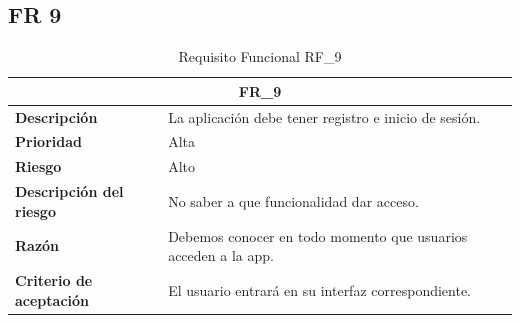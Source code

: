 \documentclass{scrreprt}
\begin{document}
\subsection{FR 9}
\begin{table}[H]
    \label{tab:my-table}
    \begin{tabular}{|p{5cm}|p{11cm}|}
    \hline
    \multicolumn{2}{|c|}{\textbf{FR_9}} \\
    \hline
    \textbf{Descripción  }                      &  La aplicación debe tener registro e inicio de sesión.                                                                       \\ \hline
    \textbf{Prioridad}                          & Alta                                                                                              \\ \hline
    \textbf{Riesgo}                          & Alto                                                                                                \\ \hline
    \textbf{Descripción del riesgo}                    & No saber a que funcionalidad dar acceso.                                                                \\ \hline
    \textbf{Razón}                   & Debemos conocer en todo momento que usuarios acceden a la app.                                                                                             \\ \hline
     \textbf{Criterio de aceptación}                    & El usuario entrará en su interfaz correspondiente.  \\ \hline
    \end{tabular}%
    
    \caption{Requisito Funcional RF_9}
\end{table}
\end{document}
